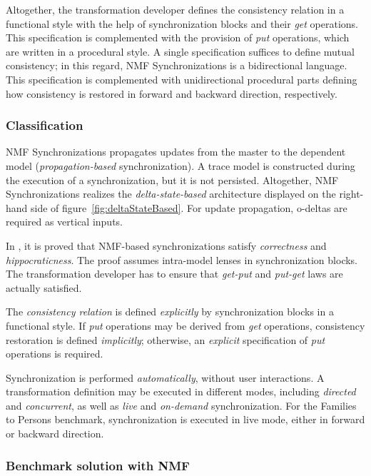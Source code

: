 Altogether, the transformation developer defines the consistency relation in a functional style with the help of synchronization blocks and their \emph{get} operations. This specification is complemented with the provision of \emph{put} operations, which are written in a procedural style. A single specification suffices to define mutual consistency; in this regard, NMF Synchronizations is a bidirectional language. This specification is complemented with unidirectional procedural parts defining how consistency is restored in forward and backward direction, respectively.

\subsubsection{Classification}
\label{sec:ClassificationNMF}

NMF Synchronizations propagates updates from the master to the dependent model (\emph{propagation-based} synchronization). A trace model is constructed during the execution of a synchronization, but it is not persisted. Altogether, NMF Synchronizations realizes the \emph{delta-state-based} architecture displayed on the right-hand side of figure~\ref{fig:deltaStateBased}. For update propagation, o-deltas are required as vertical inputs.

In \cite{SoSyM2017-Hinkel}, it is proved that NMF-based synchronizations satisfy \emph{correctness} and \emph{hippocraticness}. The proof assumes intra-model lenses in synchronization blocks. The transformation developer has to ensure that \emph{get-put} and \emph{put-get} laws are actually satisfied.

The \emph{consistency relation} is defined \emph{explicitly} by synchronization blocks in a functional style. If \emph{put} operations may be derived from \emph{get} operations, consistency restoration is defined \emph{implicitly}; otherwise, an \emph{explicit} specification of \emph{put} operations is required. 

Synchronization is performed \emph{automatically}, without user interactions. A transformation definition may be executed in different modes, including \emph{directed} and \emph{concurrent}, as well as \emph{live} and \emph{on-demand} synchronization. For the Families to Persons benchmark, synchronization is executed in live mode, either in forward or backward direction. 

\subsubsection{Benchmark solution with NMF}
\label{sec:solutionNMF}

